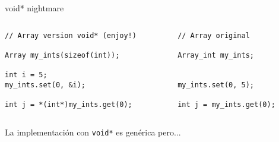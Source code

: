 \begin{frame}[fragile]{void* nightmare}
   \begin{columns}[t]
      \begin{column}{.55\linewidth}
         \begin{lstlisting}[style=normal,linebackgroundcolor={%
         \only<1>{\def\lst@linebgrdcmd####1####2####3{}}%
         \btLstHLB<2>{6}% uso de literal
         \btLstHLB<3>{8}% copia
         \btLstHLB<4>{8}% casteo
   }]
// Array version void* (enjoy!)

Array my_ints(sizeof(int));

int i = 5;
my_ints.set(0, &i);

int j = *(int*)my_ints.get(0);
         \end{lstlisting}
      \end{column}
      \begin{column}{.40\linewidth}
         \begin{lstlisting}[style=normalnonumbers,linebackgroundcolor={%
         \only<1>{\def\lst@linebgrdcmd####1####2####3{}}%
         \btLstHLB<2>{6}% uso de literal
         \btLstHLB<3-4>{8}% copia y casteo
   }]
// Array original

Array_int my_ints;


my_ints.set(0, 5);

int j = my_ints.get(0);
         \end{lstlisting}
      \end{column}
   \end{columns}
\vphantom{X}
La implementaci\'on con \lstinline[style=normal]!void*! es gen\'erica pero...\\
\end{frame}

